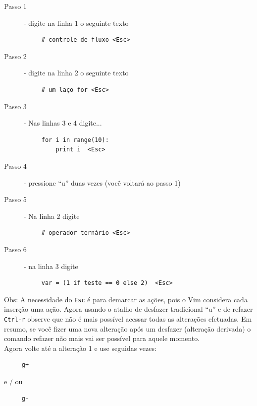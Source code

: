 \documentclass[10pt,a4paper,openany]{book}
\begin{document}
\begin{description}
\item [Passo 1] - digite na linha 1 o seguinte texto
\begin{verbatim}
     # controle de fluxo <Esc>
\end{verbatim}

\item [Passo 2] - digite na linha 2 o seguinte texto
\begin{verbatim}
     # um laço for <Esc>
\end{verbatim}

\item [Passo 3] - Nas linhas 3 e 4 digite...

\begin{verbatim}
     for i in range(10):
         print i  <Esc>
\end{verbatim}

\item [Passo 4] - pressione ``u'' duas vezes (você voltará ao passo 1)
\item [Passo 5] - Na linha 2 digite

\begin{verbatim}
     # operador ternário <Esc>
\end{verbatim}

\item [Passo 6] - na linha 3 digite

\begin{verbatim}
     var = (1 if teste == 0 else 2)  <Esc>
\end{verbatim}

\end{description}

Obs: A necessidade do {\tt Esc} é para demarcar as ações, pois o Vim
considera cada inserção uma ação.  Agora usando o atalho de desfazer
tradicional ``u'' e de refazer {\tt Ctrl-r} observe que não é mais possível
acessar todas as alterações efetuadas. Em resumo, se você fizer uma
nova alteração após um desfazer (alteração derivada) o comando refazer
não mais vai ser possível para aquele momento. \\

Agora volte até a alteração 1 e use seguidas vezes:

\begin{verbatim}
     g+
\end{verbatim}

e / ou

\begin{verbatim}
     g-
\end{verbatim}
\end{document}
